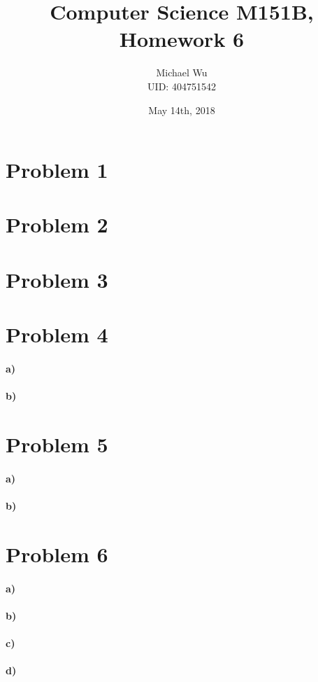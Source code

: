 \documentclass[12pt]{article}
\begin{document}
\title{Computer Science M151B, Homework 6}
\date{May 14th, 2018}
\author{Michael Wu\\UID: 404751542}
\maketitle

\section*{Problem 1}

\section*{Problem 2}

\section*{Problem 3}

\section*{Problem 4}

\paragraph{a)}

\paragraph{b)}

\section*{Problem 5}

\paragraph{a)}

\paragraph{b)}

\section*{Problem 6}

\paragraph{a)}

\paragraph{b)}

\paragraph{c)}

\paragraph{d)}
\end{document}
